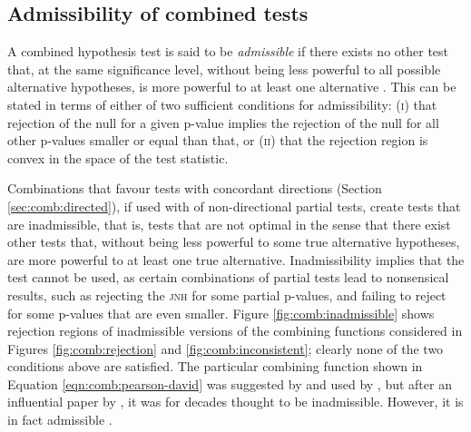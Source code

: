 \subsection{Admissibility of combined tests}
\label{sec:comb:admissibility}

A combined hypothesis test is said to be \emph{admissible} if there exists no other test that, at the same significance level, without being less powerful to all possible alternative hypotheses, is more powerful to at least one alternative \citep{Lehmann2005}. This can be stated in terms of either of two sufficient conditions for admissibility: (\textsc{i}) that rejection of the null for a given p-value implies the rejection of the null for all other p-values smaller or equal than that, or (\textsc{ii}) that the rejection region is convex in the space of the test statistic.

Combinations that favour tests with concordant directions (Section \ref{sec:comb:directed}), if used with of non-directional partial tests, create tests that are inadmissible, that is, tests that are not optimal in the sense that there exist other tests that, without being less powerful to some true alternative hypotheses, are more powerful to at least one true alternative. Inadmissibility implies that the test cannot be used, as certain combinations of partial tests lead to nonsensical results, such as rejecting the \textsc{jnh} for some partial p-values, and failing to reject for some p-values that are even smaller. Figure \ref{fig:comb:inadmissible} shows rejection regions of inadmissible versions of the combining functions considered in Figures \ref{fig:comb:rejection} and \ref{fig:comb:inconsistent}; clearly none of the two conditions above are satisfied. The particular combining function shown in Equation \ref{eqn:comb:pearson-david} was suggested by \citet{Pearson1933} and used by \citet{David1934}, but after an influential paper by \citet{Birnbaum1954}, it was for decades thought to be inadmissible. However, it is in fact admissible \citep{Owen2009}.

